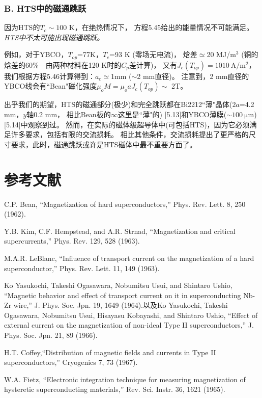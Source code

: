 \subsubsection*{B. HTS中的磁通跳跃}

因为HTS的$T_c\sim 100$ K，在绝热情况下，
方程5.45给出的能量情况不可能满足。\textit{HTS中不太可能出现磁通跳跃。}

例如，对于YBCO，$T_{op}$=77K，$T_c$=93 K (零场无电流)，
焓差$\simeq$20 MJ/$\mathrm{m^3}$
(铜的焓差的60\%---由两种材料在120 K时的$C_p$差计算)，
又有$J_c(T_{op})=1010\ \mathrm{A/m^2}$，
我们根据方程5.46计算得到：$a_c\simeq$1mm ($\sim$2 mm直径)。
注意到，2 mm直径的YBCO线会有``Bean"磁化强度$\mu_o M=\mu_o a J_c(T_{op})\sim$ 2T。

出乎我们的期望，HTS的磁通部分(极少)和完全跳跃都在Bi2212``薄"晶体($2a$=4.2 mm，$y$轴0.2 mm，
相比Bean板的$\infty$这里是``薄"的)
[5.13]和YBCO薄膜($\sim 100\ \mathrm{\mu}$m)[5.14]中观察到过。
然而，在实际的磁体级超导体中(可包括HTS)，因为它必须满足许多要求，包括有限的交流损耗。
相比其他条件，交流损耗提出了更严格的尺寸要求，此时，磁通跳跃或许是HTS磁体中最不重要方面了。

\section*{参考文献}
\noindent [5.1] C.P. Bean, “Magnetization of hard superconductors,” Phys. Rev. Lett. 8, 250
(1962).

\noindent [5.2] Y.B. Kim, C.F. Hempstead, and A.R. Strnad, “Magnetization and critical supercurrents,”
Phys. Rev. 129, 528 (1963).

\noindent [5.3] M.A.R. LeBlanc, “Influence of transport current on the magnetization of a hard superconductor,” Phys. Rev. Lett. 11, 149 (1963).

\noindent [5.4] Ko Yasukochi, Takeshi Ogasawara, Nobumitsu Usui, and Shintaro Ushio, “Magnetic behavior and effect of transport current on it in superconducting Nb-Zr wire,”
J. Phys. Soc. Jpn. 19, 1649 (1964).以及Ko Yasukochi, Takeshi Ogasawara, Nobumitsu Usui, Hisayasu Kobayashi, and Shintaro Ushio, “Effect of external current on the magnetization of non-ideal Type
II superconductors,” J. Phys. Soc. Jpn. 21, 89 (1966).

\noindent [5.5] H.T. Coffey,“Distribution of magnetic fields and currents in Type II superconductors,”
Cryogenics 7, 73 (1967).

\noindent [5.6] W.A. Fietz, “Electronic integration technique for measuring magnetization of hysteretic
superconducting materials,” Rev. Sci. Instr. 36, 1621 (1965).

